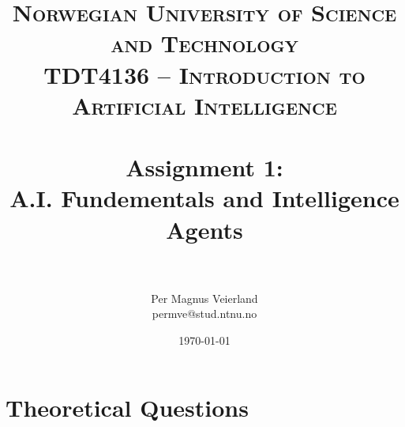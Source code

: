 

\title{	
\normalfont \normalsize 
\textsc{Norwegian University of Science and Technology\\TDT4136 -- Introduction to Artificial Intelligence} \\ [25pt]
\horrule{0.5pt} \\[0.4cm]
\huge Assignment 1:\\ A.I. Fundementals and Intelligence Agents\\
\horrule{2pt} \\[0.5cm]
}

\author{Per Magnus Veierland\\permve@stud.ntnu.no}

\date{\normalsize\today}


\maketitle

\section*{Theoretical Questions}

